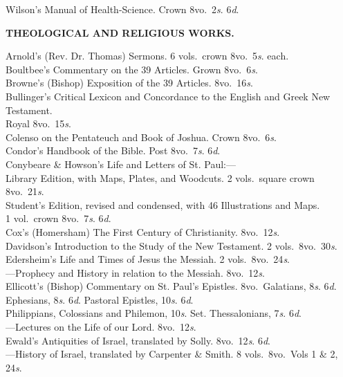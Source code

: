 \documentclass[letterpaper,12pt,oneside,openany]{memoir}
\newcommand{\D}{\hspace*{5mm}}
\newcommand{\E}{\hspace*{2mm}---\hspace*{2mm}}
\begin{document}
\begin{footnotesize}
Wilson's Manual of Health-Science. Crown 8vo.\ 2\textit{s}. 6\textit{d}.
\begin{center}
\textbf{THEOLOGICAL AND RELIGIOUS WORKS.}
\end{center}
Arnold's (Rev. Dr. Thomas) Sermons. 6 vols.\ crown 8vo.\ 5\textit{s}. each.\\
Boultbee's Commentary on the 39 Articles. Grown 8vo.\ 6\textit{s}.\\
Browne's (Bishop) Exposition of the 39 Articles. 8vo.\ 16\textit{s}.\\
Bullinger's Critical Lexicon and Concordance to the English and Greek New Testament.\\
\D Royal 8vo.\ 15\textit{s}.\\
Colenso on the Pentateuch and Book of Joshua. Crown 8vo.\ 6\textit{s}.\\
Condor's Handbook of the Bible. Post 8vo.\ 7\textit{s}. 6\textit{d}.\\
Conybeare \& Howson's Life and Letters of St. Paul:---\\
\D Library Edition, with Maps, Plates, and Woodcuts. 2 vols.\ square crown 8vo.\ 21\textit{s}.\\
\D Student's Edition, revised and condensed, with 46 Illustrations and Maps.\\
\D\D 1 vol.\ crown 8vo.\ 7\textit{s}. 6\textit{d}.\\
Cox's (Homersham) The First Century of Christianity. 8vo.\ 12\textit{s}.\\
Davidson's Introduction to the Study of the New Testament. 2 vols.\ 8vo.\ 30\textit{s}.\\
Edersheim's Life and Times of Jesus the Messiah. 2 vols.\ 8vo.\ 24\textit{s}.\\
\E Prophecy and History in relation to the Messiah. 8vo.\ 12\textit{s}.\\
Ellicott's (Bishop) Commentary on St. Paul's Epistles. 8vo.\ Galatians, 8\textit{s}. 6\textit{d}.\\
\D Ephesians, 8\textit{s}. 6\textit{d}. Pastoral Epistles, 10\textit{s}. 6\textit{d}. \\
\D Philippians, Colossians and Philemon, 10\textit{s}. Set. Thessalonians, 7\textit{s}. 6\textit{d}.\\
\D\E Lectures on the Life of our Lord. 8vo.\ 12\textit{s}.\\
Ewald's Antiquities of Israel, translated by Solly. 8vo.\ 12\textit{s}. 6\textit{d}.\\
\E History of Israel, translated by Carpenter \& Smith. 8 vols.\ 8vo.\ Vols 1 \& 2, 24\textit{s}.\\

\end{footnotesize}
\end{document}
